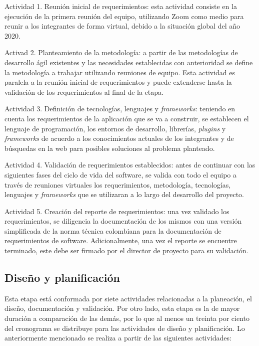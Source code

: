 \begin{APAitemize}
    \item Actividad 1. Reunión inicial de requerimientos: esta actividad consiste en la ejecución de la primera reunión del equipo, utilizando Zoom como medio para reunir a los integrantes de forma virtual, debido a la situación global del año 2020.
    \item Activad 2. Planteamiento de la metodología: a partir de las metodologías de desarrollo ágil existentes y las necesidades establecidas con anterioridad se define la metodología a trabajar utilizando reuniones de equipo. Esta actividad es paralela a la reunión inicial de requerimientos y puede extenderse hasta la validación de los requerimientos al final de la etapa.
    \item Actividad 3. Definición de tecnologías, lenguajes y \textit{frameworks}: teniendo en cuenta los requerimientos de la aplicación que se va a construir, se establecen el lenguaje de programación, los entornos de desarrollo, librerías, \textit{plugins} y \textit{frameworks} de acuerdo a los conocimientos actuales de los integrantes y de búsquedas en la web para posibles soluciones al problema planteado.
    \item Actividad 4. Validación de requerimientos establecidos: antes de continuar con las siguientes fases del ciclo de vida del software, se valida con todo el equipo a través de reuniones virtuales los requerimientos, metodología, tecnologías, lenguajes y \textit{frameworks} que se utilizaran a lo largo del desarrollo del proyecto.
    \item Actividad 5. Creación del reporte de requerimientos: una vez validado los requerimientos, se diligencia la documentación de los mismos con una versión simplificada de la norma técnica colombiana para la documentación de requerimientos de software. Adicionalmente, una vez el reporte se encuentre terminado, este debe ser firmado por el director de proyecto para su validación.
\end{APAitemize}

\subsection{Diseño y planificación}
Esta etapa está conformada por siete actividades relacionadas a la planeación, el diseño, documentación y validación. Por otro lado, esta etapa es la de mayor duración a comparación de las demás, por lo que al menos un treinta por ciento del cronograma se distribuye para las actividades de diseño y planificación. Lo anteriormente mencionado se realiza a partir de las siguientes actividades:

